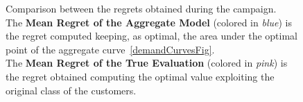 \begin{figure}[!htb]
	\caption{Comparison between the regrets obtained during the campaign.\\
			The \textbf{Mean Regret of the Aggregate Model} (colored in \textit{blue}) is the regret computed keeping, as optimal, the area under the optimal point of the aggregate curve~\ref{demandCurvesFig}.\\
			The \textbf{Mean Regret of the True Evaluation} (colored in \textit{pink}) is the regret obtained computing the optimal value exploiting the original class of the customers.}
	\label{regret5Fig}
\end{figure}
